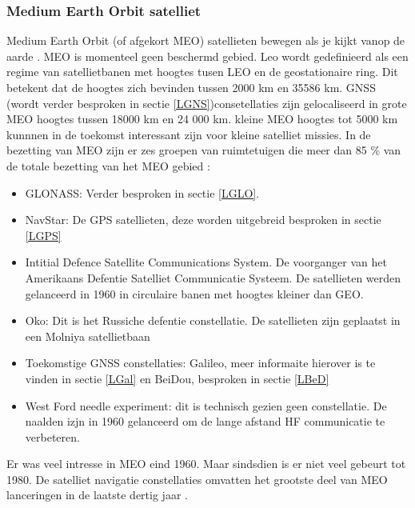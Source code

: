 \subsubsection{Medium Earth Orbit satelliet}
Medium Earth Orbit (of afgekort MEO) satellieten bewegen als je kijkt vanop de aarde \cite{LBibGEO}. MEO is momenteel geen beschermd gebied. Leo wordt gedefinieerd als een regime van satellietbanen met hoogtes tusen LEO en de geostationaire ring. Dit betekent dat de hoogtes zich bevinden tussen 2000 km en 35586 km.  GNSS (wordt verder besproken in sectie \ref{LGNS})consetellaties zijn gelocaliseerd in grote MEO hoogtes tussen 18000 km en 24 000 km. kleine MEO hoogtes tot 5000 km kunnnen in de toekomst interessant zijn voor kleine satelliet missies. In de bezetting van MEO zijn er zes groepen van ruimtetuigen die meer dan 85 \% van de totale bezetting van het MEO gebied \cite{LBibMEO}:
\begin{itemize}
	\item GLONASS: Verder besproken in sectie \ref{LGLO}. 
	\item NavStar: De GPS satellieten, deze worden uitgebreid besproken in sectie \ref{LGPS}
	\item Intitial Defence Satellite Communications System. De voorganger van het Amerikaans Defentie Satelliet Communicatie Systeem. De satellieten werden gelanceerd in 1960 in circulaire banen met hoogtes kleiner dan GEO.
	\item  Oko: Dit is het Russiche defentie constellatie. De satellieten zijn geplaatst in een Molniya satellietbaan
	\item Toekomstige GNSS constellaties: Galileo, meer informaite hierover is te vinden in sectie \ref{LGal} en BeiDou, besproken in sectie \ref{LBeD}
	\item West Ford needle experiment: dit is technisch gezien geen constellatie. De naalden izjn in 1960 gelanceerd om de lange afstand HF communicatie te verbeteren. 
\end{itemize}
Er was veel intresse in MEO eind 1960. Maar sindsdien is er niet veel gebeurt tot 1980. De satelliet navigatie constellaties omvatten het grootste deel van MEO lanceringen in de laatste dertig jaar \cite{LBibMEO}.

